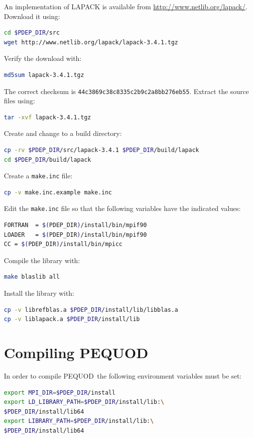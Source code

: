 \documentclass[a4paper]{article}
\newcommand{\pequod}{PEQUOD}
\begin{document}
An implementation of LAPACK is available from \url{http://www.netlib.org/lapack/}.
Download it using:
\begin{lstlisting}[language = bash, frame = single]
cd $PDEP_DIR/src
wget http://www.netlib.org/lapack/lapack-3.4.1.tgz
\end{lstlisting}
Verify the download with:
\begin{lstlisting}[language = bash, frame = single]
md5sum lapack-3.4.1.tgz
\end{lstlisting}
The correct checksum is \verb+44c3869c38c8335c2b9c2a8bb276eb55+. Extract the
source files using:
\begin{lstlisting}[language = bash, frame = single]
tar -xvf lapack-3.4.1.tgz
\end{lstlisting}
Create and change to a build directory:
\begin{lstlisting}[language = bash, frame = single]
cp -rv $PDEP_DIR/src/lapack-3.4.1 $PDEP_DIR/build/lapack
cd $PDEP_DIR/build/lapack
\end{lstlisting}
Create a \verb+make.inc+ file:
\begin{lstlisting}[language = bash, frame = single]
cp -v make.inc.example make.inc
\end{lstlisting}
Edit the \verb+make.inc+ file so that the following variables have the indicated
values:
\begin{lstlisting}[language = bash, frame = single]
FORTRAN  = $(PDEP_DIR)/install/bin/mpif90
LOADER   = $(PDEP_DIR)/install/bin/mpif90
CC = $(PDEP_DIR)/install/bin/mpicc
\end{lstlisting}
Compile the library with:
\begin{lstlisting}[language = bash, frame = single]
make blaslib all
\end{lstlisting}
Install the library with:
\begin{lstlisting}[language = bash, frame = single]
cp -v librefblas.a $PDEP_DIR/install/lib/libblas.a
cp -v liblapack.a $PDEP_DIR/install/lib
\end{lstlisting}

\section{Compiling \pequod}

In order to compile \pequod\ the following environment variables must be set:
\begin{lstlisting}[language = bash, frame = single]
export MPI_DIR=$PDEP_DIR/install
export LD_LIBRARY_PATH=$PDEP_DIR/install/lib:\
$PDEP_DIR/install/lib64
export LIBRARY_PATH=$PDEP_DIR/install/lib:\
$PDEP_DIR/install/lib64
\end{lstlisting}
\end{document}
